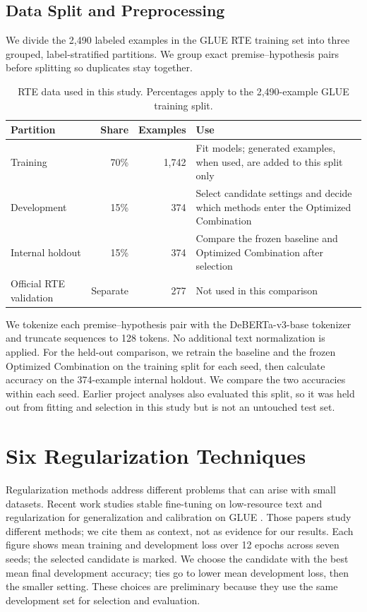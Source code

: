 \documentclass[letterpaper]{article}
\begin{document}
\subsection{Data Split and Preprocessing}
We divide the 2,490 labeled examples in the GLUE RTE training set into three grouped, label-stratified partitions. We group exact premise--hypothesis pairs before splitting so duplicates stay together.
\begin{table}[tp]
\centering\small\setlength{\tabcolsep}{5pt}
\caption{RTE data used in this study. Percentages apply to the 2,490-example GLUE training split.}
\label{tab:data-splits}
\begin{tabular}{lrrp{}}
\toprule
Partition & Share & Examples & Use \\
\midrule
Training & 70\% & 1,742 & Fit models; generated examples, when used, are added to this split only \\
Development & 15\% & 374 & Select candidate settings and decide which methods enter the Optimized Combination \\
Internal holdout & 15\% & 374 & Compare the frozen baseline and Optimized Combination after selection \\
Official RTE validation & Separate & 277 & Not used in this comparison \\
\bottomrule
\end{tabular}
\end{table}

We tokenize each premise--hypothesis pair with the DeBERTa-v3-base tokenizer and truncate sequences to 128 tokens. No additional text normalization is applied. For the held-out comparison, we retrain the baseline and the frozen Optimized Combination on the training split for each seed, then calculate accuracy on the 374-example internal holdout. We compare the two accuracies within each seed. Earlier project analyses also evaluated this split, so it was held out from fitting and selection in this study but is not an untouched test set.

\section{Six Regularization Techniques}
Regularization methods address different problems that can arise with small datasets. Recent work studies stable fine-tuning on low-resource text and regularization for generalization and calibration on GLUE \cite{somayajula2024,jukic2025}. Those papers study different methods; we cite them as context, not as evidence for our results. Each figure shows mean training and development loss over 12 epochs across seven seeds; the selected candidate is marked. We choose the candidate with the best mean final development accuracy; ties go to lower mean development loss, then the smaller setting. These choices are preliminary because they use the same development set for selection and evaluation.
\end{document}
